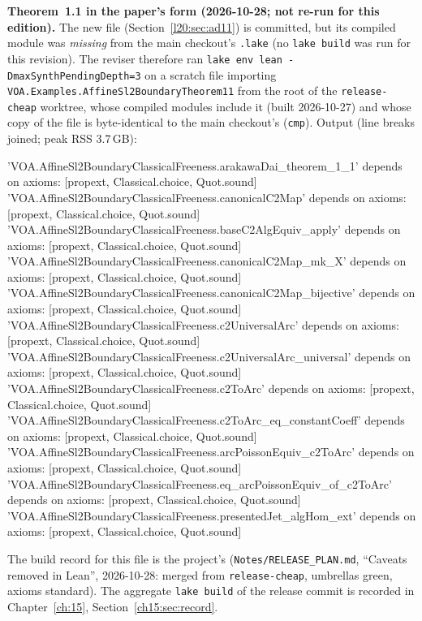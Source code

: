 \textbf{Theorem~1.1 in the paper's form (2026-10-28; not re-run for this edition).} The new file
 (Section~\ref{l20:sec:ad11}) is committed, but its
compiled module was \emph{missing} from the main checkout's \texttt{.lake} (no \texttt{lake build} was run for this revision). The
reviser therefore ran \texttt{lake env lean -DmaxSynthPendingDepth=3} on a scratch file importing
\texttt{VOA.Examples.AffineSl2BoundaryTheorem11} from the root of the \texttt{release-cheap} worktree, whose compiled modules
include it (built 2026-10-27) and whose copy of the file is byte-identical to the main checkout's (\texttt{cmp}). Output (line
breaks joined; peak RSS 3.7\,GB):
\begin{plaincode}
'VOA.AffineSl2BoundaryClassicalFreeness.arakawaDai_theorem_1_1' depends on axioms: [propext, Classical.choice, Quot.sound]
'VOA.AffineSl2BoundaryClassicalFreeness.canonicalC2Map' depends on axioms: [propext, Classical.choice, Quot.sound]
'VOA.AffineSl2BoundaryClassicalFreeness.baseC2AlgEquiv_apply' depends on axioms: [propext, Classical.choice, Quot.sound]
'VOA.AffineSl2BoundaryClassicalFreeness.canonicalC2Map_mk_X' depends on axioms: [propext, Classical.choice, Quot.sound]
'VOA.AffineSl2BoundaryClassicalFreeness.canonicalC2Map_bijective' depends on axioms: [propext, Classical.choice, Quot.sound]
'VOA.AffineSl2BoundaryClassicalFreeness.c2UniversalArc' depends on axioms: [propext, Classical.choice, Quot.sound]
'VOA.AffineSl2BoundaryClassicalFreeness.c2UniversalArc_universal' depends on axioms: [propext, Classical.choice, Quot.sound]
'VOA.AffineSl2BoundaryClassicalFreeness.c2ToArc' depends on axioms: [propext, Classical.choice, Quot.sound]
'VOA.AffineSl2BoundaryClassicalFreeness.c2ToArc_eq_constantCoeff' depends on axioms: [propext, Classical.choice, Quot.sound]
'VOA.AffineSl2BoundaryClassicalFreeness.arcPoissonEquiv_c2ToArc' depends on axioms: [propext, Classical.choice, Quot.sound]
'VOA.AffineSl2BoundaryClassicalFreeness.eq_arcPoissonEquiv_of_c2ToArc' depends on axioms: [propext, Classical.choice, Quot.sound]
'VOA.AffineSl2BoundaryClassicalFreeness.presentedJet_algHom_ext' depends on axioms: [propext, Classical.choice, Quot.sound]
\end{plaincode}
The build record for this file is the project's (\texttt{Notes/RELEASE\_PLAN.md}, ``Caveats removed in Lean'', 2026-10-28:
merged from \texttt{release-cheap}, umbrellas green, axioms standard). The aggregate \texttt{lake build} of the release commit is recorded in Chapter~\ref{ch:15},
Section~\ref{ch15:sec:record}.

